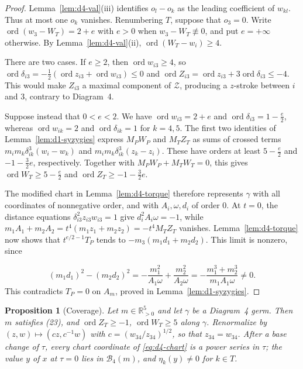 \documentclass[11pt]{amsart}
\newtheorem{proposition}[theorem]{Proposition}
\theoremstyle{definition}
\theoremstyle{remark}
\newcommand{\Rp}{\mathbb{R}_{>0}}
\newcommand{\ord}{\operatorname{ord}}
\begin{document}
\begin{proof}
{Lemma~\ref{lem:d4-val}(iii) identifies $o_l-o_k$ as the leading coefficient
of $w_{kl}$. Thus at most one}
{$o_k$ vanishes.  Renumbering $T$, suppose that $o_3=0$.  Write
$\ord(w_3-W_T)=2+e$ with $e>0$ when $w_3-W_T\not\equiv0$, and put $e=+\infty$ otherwise.}
By Lemma~\ref{lem:d4-val}(ii), $\ord(W_T-w_i)\ge4$.

{There are two cases. If $e\ge2$, then $\ord w_{i3}\ge4$, so
$\ord\delta_{i3}=-\frac12(\ord z_{i3}+\ord w_{i3})\le0$ and
$\ord Z_{i3}=\ord z_{i3}+3\ord\delta_{i3}\le-4$. This would make $Z_{i3}$ a maximal component
of $\mathcal Z$, producing a $z$-stroke between $i$ and $3$, contrary to Diagram~4.

Suppose instead that $0<e<2$. We have $\ord w_{i3}=2+e$ and $\ord\delta_{i3}=1-\frac e2$,
whereas $\ord w_{ik}=2$ and $\ord\delta_{ik}=1$ for $k=4,5$.
The first two identities of Lemma~\ref{lem:d1-syzygies} express $M_PW_P$ and $M_TZ_T$
as sums of crossed terms $m_im_k\delta_{ik}^3(w_i-w_k)$ and $m_im_k\delta_{ik}^3(z_k-z_i)$.
These have orders at least $5-\frac e2$ and $-1-\frac32e$, respectively.
Together with $M_PW_P+M_TW_T=0$, this gives $\ord W_T\ge5-\frac e2$ and
$\ord Z_T\ge-1-\frac32e$.

The modified chart in Lemma~\ref{lem:d4-torque} therefore represents $\gamma$ with all coordinates
of nonnegative order, and with $A_i,\omega,d_i$ of order $0$.
At $t=0$, the distance equations $\delta_{i3}^2z_{i3}w_{i3}=1$ give $d_i^2A_i\omega=-1$,
while $m_1A_1+m_2A_2=t^4(m_1z_1+m_2z_2)=-t^4M_TZ_T$ vanishes.
Lemma~\ref{lem:d4-torque} now shows that $t^{e/2-1}T_P$ tends to $-m_3(m_1d_1+m_2d_2)$.
This limit is nonzero, since}
\[
  (m_1d_1)^2-(m_2d_2)^2=-\frac{m_1^2}{A_1\omega}+\frac{m_2^2}{A_2\omega}
  =-\frac{m_1^3+m_2^3}{m_1A_1\omega}\ne0 .
\]
{This contradicts $T_P=0$ on $A_m$, proved in Lemma~\ref{lem:d1-syzygies}.}
\end{proof}

\begin{proposition}[Coverage]\label{prop:d4-cover}
Let $m\in\Rp^5$ and let $\gamma$ be a Diagram~4 germ.  Then $m$ satisfies (23), and
$\ord Z_T\ge-1$, $\ord W_T\ge5$ along $\gamma$.  Renormalize by $(z,w)\mapsto(cz,c^{-1}w)$ with
$c=(w_{34}/z_{34})^{1/2}$, so that $z_{34}=w_{34}$.  After a base change of $\tau$, every chart
coordinate of \eqref{eq:d4-chart} is a power series in $\tau$; the value $y$ of $x$ at $\tau=0$
lies in $\mathcal B_4(m)$, and $\eta_k(y)\ne0$ for $k\in T$.
\end{proposition}
\end{document}
